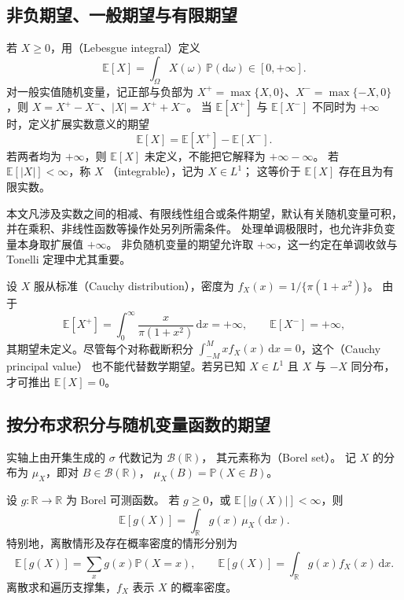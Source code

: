 \documentclass[UTF8]{ctexart}
\begin{document}
\subsection{非负期望、一般期望与有限期望}

\begin{definition}[数学期望与可积性]
\label{def:expectation-integrability}
若 $X\geq0$，用（Lebesgue integral）定义
\[
  \mathbb E[X]=\int_\Omega X(\omega)\,\mathbb P(\mathrm d\omega)\in[0,+\infty].
\]
对一般实值随机变量，记正部与负部为
$X^+=\max\{X,0\}$、$X^-=\max\{-X,0\}$，则
$X=X^+-X^-$、$|X|=X^++X^-$。
当 $\mathbb E[X^+]$ 与 $\mathbb E[X^-]$ 不同时为 $+\infty$ 时，定义扩展实数意义的期望
\[
  \mathbb E[X]=\mathbb E[X^+]-\mathbb E[X^-].
\]
若两者均为 $+\infty$，则 $\mathbb E[X]$ 未定义，不能把它解释为 $+\infty-\infty$。
若 $\mathbb E[|X|]<\infty$，称 $X$ （integrable），记为 $X\in L^1$；
这等价于 $\mathbb E[X]$ 存在且为有限实数。
\end{definition}

本文凡涉及实数之间的相减、有限线性组合或条件期望，默认有关随机变量可积，
并在乘积、非线性函数等操作处另列所需条件。
处理单调极限时，也允许非负变量本身取扩展值 $+\infty$。
非负随机变量的期望允许取 $+\infty$，这一约定在单调收敛与 Tonelli 定理中尤其重要。

\begin{example}[对称不保证期望为零]
\label{ex:expectation-cauchy}
设 $X$ 服从标准（Cauchy distribution），密度为
$f_X(x)=1/\{\pi(1+x^2)\}$。
由于
\[
  \mathbb E[X^+]=\int_0^\infty\frac{x}{\pi(1+x^2)}\,\mathrm dx=+\infty,
  \qquad \mathbb E[X^-]=+\infty,
\]
其期望未定义。尽管每个对称截断积分
$\int_{-M}^{M}x f_X(x)\,\mathrm dx=0$，这个（Cauchy principal value）
也不能代替数学期望。若另已知 $X\in L^1$ 且 $X$ 与 $-X$ 同分布，才可推出 $\mathbb E[X]=0$。
\end{example}

\subsection{按分布求积分与随机变量函数的期望}

实轴上由开集生成的 $\sigma$ 代数记为 $\mathcal B(\mathbb R)$，
其元素称为（Borel set）。
记 $X$ 的分布为 $\mu_X$，即对 $B\in\mathcal B(\mathbb R)$，
$\mu_X(B)=\mathbb P(X\in B)$。

\begin{theorem}[分布积分公式]
\label{thm:expectation-lotus}
设 $g:\mathbb R\to\mathbb R$ 为 Borel 可测函数。
若 $g\geq0$，或 $\mathbb E[|g(X)|]<\infty$，则
\begin{equation}
  \mathbb E[g(X)]=\int_{\mathbb R}g(x)\,\mu_X(\mathrm dx).
  \label{eq:expectation-lotus}
\end{equation}
特别地，离散情形及存在概率密度的情形分别为
\[
  \mathbb E[g(X)]=\sum_x g(x)\mathbb P(X=x),
  \qquad
  \mathbb E[g(X)]=\int_{\mathbb R}g(x)f_X(x)\,\mathrm dx.
\]
离散求和遍历支撑集，$f_X$ 表示 $X$ 的概率密度。
\end{theorem}
\end{document}
